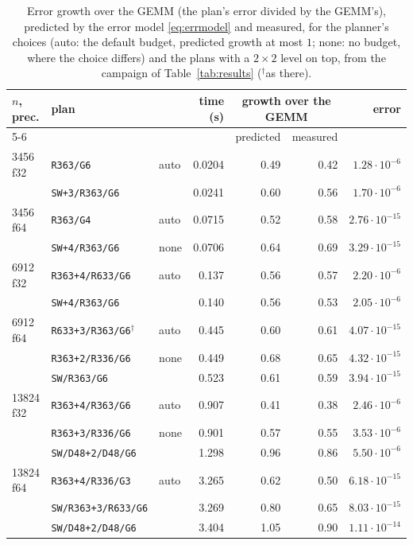 \documentclass[11pt]{article}
\newcommand{\lv}[1]{\texttt{#1}}
\begin{document}
\begin{table}[!htb]
\centering\small
\begin{tabular}{lllrrrr}
\toprule
$n$, prec. & plan & & time (s) & \multicolumn{2}{c}{growth over the GEMM} & error\\
\cmidrule(lr){5-6}
 & & & & predicted & measured & \\
\midrule
3456 f32 & \lv{R363/G6} & auto & 0.0204 & 0.49 & 0.42 & $1.28\cdot10^{-6}$\\
 & \lv{SW+3/R363/G6} & & 0.0241 & 0.60 & 0.56 & $1.70\cdot10^{-6}$\\
3456 f64 & \lv{R363/G4} & auto & 0.0715 & 0.52 & 0.58 & $2.76\cdot10^{-15}$\\
 & \lv{SW+4/R363/G6} & none & 0.0706 & 0.64 & 0.69 & $3.29\cdot10^{-15}$\\
6912 f32 & \lv{R363+4/R633/G6} & auto & 0.137 & 0.56 & 0.57 & $2.20\cdot10^{-6}$\\
 & \lv{SW+4/R363/G6} & & 0.140 & 0.56 & 0.53 & $2.05\cdot10^{-6}$\\
6912 f64 & \lv{R633+3/R363/G6}$^\dagger$ & auto & 0.445 & 0.60 & 0.61 & $4.07\cdot10^{-15}$\\
 & \lv{R363+2/R336/G6} & none & 0.449 & 0.68 & 0.65 & $4.32\cdot10^{-15}$\\
 & \lv{SW/R363/G6} & & 0.523 & 0.61 & 0.59 & $3.94\cdot10^{-15}$\\
13824 f32 & \lv{R363+4/R363/G6} & auto & 0.907 & 0.41 & 0.38 & $2.46\cdot10^{-6}$\\
 & \lv{R363+3/R336/G6} & none & 0.901 & 0.57 & 0.55 & $3.53\cdot10^{-6}$\\
 & \lv{SW/D48+2/D48/G6} & & 1.298 & 0.96 & 0.86 & $5.50\cdot10^{-6}$\\
13824 f64 & \lv{R363+4/R336/G3} & auto & 3.265 & 0.62 & 0.50 & $6.18\cdot10^{-15}$\\
 & \lv{SW/R363+3/R633/G6} & & 3.269 & 0.80 & 0.65 & $8.03\cdot10^{-15}$\\
 & \lv{SW/D48+2/D48/G6} & & 3.404 & 1.05 & 0.90 & $1.11\cdot10^{-14}$\\
\bottomrule
\end{tabular}
\caption{Error growth over the GEMM (the plan's error divided by the GEMM's),
predicted by the error model \eqref{eq:errmodel} and measured, for the planner's choices (auto: the default budget,
predicted growth at most $1$; none: no budget, where the choice differs)
and the plans with a $2\times2$ level on top, from the campaign of Table~\ref{tab:results} ($^\dagger$as there).}
\label{tab:budget}
\end{table}
\end{document}
